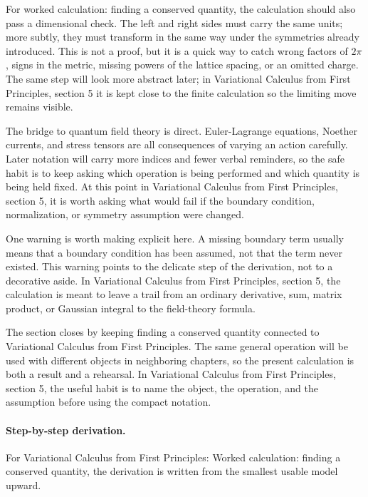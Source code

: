 For worked calculation: finding a conserved quantity, the calculation should also pass a dimensional check.  The left and right sides must carry the same units; more subtly, they must transform in the same way under the symmetries already introduced.  This is not a proof, but it is a quick way to catch wrong factors of \(2\pi\), signs in the metric, missing powers of the lattice spacing, or an omitted charge.  The same step will look more abstract later; in Variational Calculus from First Principles, section 5 it is kept close to the finite calculation so the limiting move remains visible.

The bridge to quantum field theory is direct.  Euler-Lagrange equations, Noether currents, and stress tensors are all consequences of varying an action carefully.  Later notation will carry more indices and fewer verbal reminders, so the safe habit is to keep asking which operation is being performed and which quantity is being held fixed.  At this point in Variational Calculus from First Principles, section 5, it is worth asking what would fail if the boundary condition, normalization, or symmetry assumption were changed.

One warning is worth making explicit here.  A missing boundary term usually means that a boundary condition has been assumed, not that the term never existed.  This warning points to the delicate step of the derivation, not to a decorative aside.  In Variational Calculus from First Principles, section 5, the calculation is meant to leave a trail from an ordinary derivative, sum, matrix product, or Gaussian integral to the field-theory formula.

The section closes by keeping finding a conserved quantity connected to Variational Calculus from First Principles.  The same general operation will be used with different objects in neighboring chapters, so the present calculation is both a result and a rehearsal.  In Variational Calculus from First Principles, section 5, the useful habit is to name the object, the operation, and the assumption before using the compact notation.



\paragraph{Step-by-step derivation.}

For Variational Calculus from First Principles: Worked calculation: finding a conserved quantity, the derivation is written from the smallest usable model upward.


